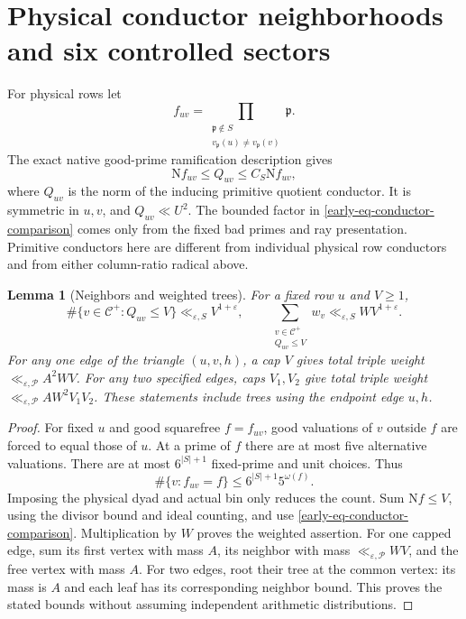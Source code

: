 \documentclass[11pt]{article}
\newtheorem{lemma}[theorem]{Lemma}
\theoremstyle{definition}
\newcommand{\N}{\mathrm N}
\newcommand{\eps}{\varepsilon}
\newcommand{\Cplus}{\mathcal C^+}
\newcommand{\lls}{\ll_{\eps,\mathcal P}}
\begin{document}
\section{Physical conductor neighborhoods and six controlled sectors}
\label{early-sec-neighbors}

For physical rows let
\[
 f_{uv}=\prod_{\substack{\mathfrak p\notin S\\
                      v_{\mathfrak p}(u)\ne v_{\mathfrak p}(v)}}
                    \mathfrak p.
\]
The exact native good-prime ramification description gives
\begin{equation}\label{early-eq-conductor-comparison}
 \N f_{uv}\le Q_{uv}\le C_S\N f_{uv},
\end{equation}
where \(Q_{uv}\) is the norm of the inducing primitive quotient
conductor.  It is symmetric in \(u,v\), and \(Q_{uv}\ll U^2\).
The bounded factor in \eqref{early-eq-conductor-comparison} comes
only from the fixed bad primes and ray presentation.
Primitive conductors here are different from individual physical row
conductors and from either column-ratio radical above.

\begin{lemma}[Neighbors and weighted trees]\label{early-lem-neighbors}
For a fixed row \(u\) and \(V\ge1\),
\[
 \#\{v\in\Cplus:Q_{uv}\le V\}
      \ll_{\eps,S}V^{1+\eps},\qquad
 \sum_{\substack{v\in\Cplus\\Q_{uv}\le V}}w_v
      \ll_{\eps,S}WV^{1+\eps}.
\]
For any one edge of the triangle \((u,v,h)\), a cap \(V\) gives
total triple weight \(\lls A^2WV\).  For any two specified edges,
caps \(V_1,V_2\) give total triple weight
\(\lls AW^2V_1V_2\).
These statements include trees using the endpoint edge \(u,h\).
\end{lemma}

\begin{proof}
For fixed \(u\) and good squarefree \(f=f_{uv}\), good valuations of
\(v\) outside \(f\) are forced to equal those of \(u\).
At a prime of \(f\) there are at most five alternative valuations.
There are at most \(6^{|S|+1}\) fixed-prime and unit choices.  Thus
\[
 \#\{v:f_{uv}=f\}\le6^{|S|+1}5^{\omega(f)}.
\]
Imposing the physical dyad and actual bin only reduces the count.
Sum \(\N f\le V\), using the divisor bound and ideal counting,
and use \eqref{early-eq-conductor-comparison}.  Multiplication by
\(W\) proves the weighted assertion.
For one capped edge, sum its first vertex with mass \(A\), its
neighbor with mass \(\lls WV\), and the free vertex with mass \(A\).
For two edges, root their tree at the common vertex: its mass is \(A\)
and each leaf has its corresponding neighbor bound.
This proves the stated bounds without assuming independent arithmetic
distributions.
\end{proof}
\end{document}
